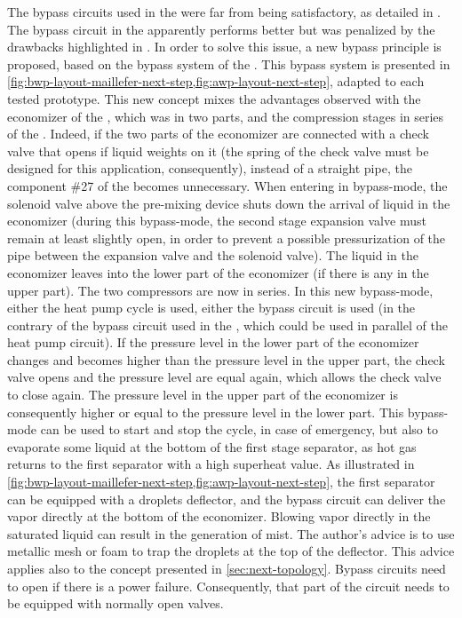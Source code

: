 The bypass circuits used in the \AWP{} were far from being
satisfactory, as detailed in . The bypass
circuit in the \BWP{} apparently performs better but was penalized by
the drawbacks highlighted in
. In order to solve this issue,
a new bypass principle is proposed, based on the bypass system of the
\BWP{}. This bypass system is presented in
\cref{fig:bwp-layout-maillefer-next-step,fig:awp-layout-next-step},
adapted to each tested prototype. This new concept mixes the
advantages observed with the economizer of the \AWP{}, which was in
two parts, and the compression stages in series of the \BWP{}. Indeed,
if the two parts of the economizer are connected with a check valve
that opens if liquid weights on it (the spring of the check valve must
be designed for this application, consequently), instead of a straight
pipe, the component \#27 of the \BWP{} becomes unnecessary. When
entering in bypass-mode, the solenoid valve above the pre-mixing
device  shuts down the
arrival of liquid in the economizer (during this bypass-mode, the
second stage expansion valve must remain at least slightly open, in
order to prevent a possible pressurization of the pipe between the
expansion valve and the solenoid valve). The liquid in the economizer
leaves into the lower part of the economizer (if there is any in the
upper part). The two compressors are now in series. In this new
bypass-mode, either the heat pump cycle is used, either the bypass
circuit is used (in the contrary of the bypass circuit used in the
\BWP{}, which could be used in parallel of the heat pump circuit). If
the pressure level in the lower part of the economizer changes and
becomes higher than the pressure level in the upper part, the check valve opens and the pressure level are equal
again, which allows the check valve to close again. The pressure level
in the upper part of the economizer is consequently higher or equal to
the pressure level in the lower part. This bypass-mode can be used to
start and stop the cycle, in case of emergency, but also to evaporate
some liquid at the bottom of the first stage separator, as hot gas
returns to the first separator with a high superheat value. As
illustrated in
\cref{fig:bwp-layout-maillefer-next-step,fig:awp-layout-next-step},
the first separator can be equipped with a droplets
deflector, and the bypass circuit can deliver
the vapor directly at the bottom of the economizer. Blowing vapor
directly in the saturated liquid can result in the generation of
mist. The author's advice is to use metallic mesh or foam to trap the
droplets at the top of the deflector. This advice applies also to the
concept presented in \cref{sec:next-topology}. Bypass circuits need to
open if there is a power failure. Consequently, that part of the
circuit needs to be equipped with normally open valves.

